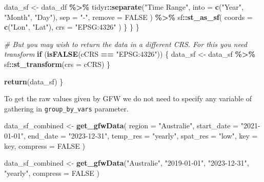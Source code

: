 \documentclass[
]{article}
\newenvironment{Shaded}{\begin{snugshade}}{\end{snugshade}}
\newcommand{\AttributeTok}[1]{\textcolor[rgb]{0.13,0.29,0.53}{#1}}
\newcommand{\CommentTok}[1]{\textcolor[rgb]{0.56,0.35,0.01}{\textit{#1}}}
\newcommand{\ConstantTok}[1]{\textcolor[rgb]{0.56,0.35,0.01}{#1}}
\newcommand{\ControlFlowTok}[1]{\textcolor[rgb]{0.13,0.29,0.53}{\textbf{#1}}}
\newcommand{\FunctionTok}[1]{\textcolor[rgb]{0.13,0.29,0.53}{\textbf{#1}}}
\newcommand{\NormalTok}[1]{#1}
\newcommand{\OtherTok}[1]{\textcolor[rgb]{0.56,0.35,0.01}{#1}}
\newcommand{\SpecialCharTok}[1]{\textcolor[rgb]{0.81,0.36,0.00}{\textbf{#1}}}
\newcommand{\StringTok}[1]{\textcolor[rgb]{0.31,0.60,0.02}{#1}}
\begin{document}
\begin{Shaded}
\begin{Highlighting}[]
\NormalTok{        data\_sf }\OtherTok{\textless{}{-}}\NormalTok{ data\_df }\SpecialCharTok{\%\textgreater{}\%}
\NormalTok{          tidyr}\SpecialCharTok{::}\FunctionTok{separate}\NormalTok{(}\StringTok{"Time Range"}\NormalTok{,}
            \AttributeTok{into =} \FunctionTok{c}\NormalTok{(}\StringTok{"Year"}\NormalTok{, }\StringTok{"Month"}\NormalTok{, }\StringTok{"Day"}\NormalTok{),}
            \AttributeTok{sep =} \StringTok{"{-}"}\NormalTok{,}
            \AttributeTok{remove =} \ConstantTok{FALSE}
\NormalTok{          ) }\SpecialCharTok{\%\textgreater{}\%}
\NormalTok{          sf}\SpecialCharTok{::}\FunctionTok{st\_as\_sf}\NormalTok{(}
            \AttributeTok{coords =} \FunctionTok{c}\NormalTok{(}\StringTok{"Lon"}\NormalTok{, }\StringTok{"Lat"}\NormalTok{),}
            \AttributeTok{crs =} \StringTok{"EPSG:4326"}
\NormalTok{          )}
\NormalTok{      \}}
\NormalTok{    \}}
\NormalTok{  \}}

  \CommentTok{\# But you may wish to return the data in a different CRS. For this you need transform}
  \ControlFlowTok{if}\NormalTok{ (}\FunctionTok{isFALSE}\NormalTok{(cCRS }\SpecialCharTok{==} \StringTok{"EPSG:4326"}\NormalTok{)) \{}
\NormalTok{    data\_sf }\OtherTok{\textless{}{-}}\NormalTok{ data\_sf }\SpecialCharTok{\%\textgreater{}\%}
\NormalTok{      sf}\SpecialCharTok{::}\FunctionTok{st\_transform}\NormalTok{(}\AttributeTok{crs =}\NormalTok{ cCRS)}
\NormalTok{  \}}

  \FunctionTok{return}\NormalTok{(data\_sf)}
\NormalTok{\}}
\end{Highlighting}
\end{Shaded}

To get the raw values given by GFW we do not need to specify any
variable of gathering in \texttt{group\_by\_vars} parameter.

\begin{Shaded}
\begin{Highlighting}[]
\NormalTok{data\_sf\_combined }\OtherTok{\textless{}{-}} \FunctionTok{get\_gfwData}\NormalTok{(}
  \AttributeTok{region =} \StringTok{"Australie"}\NormalTok{,}
  \AttributeTok{start\_date =} \StringTok{"2021{-}01{-}01"}\NormalTok{,}
  \AttributeTok{end\_date =} \StringTok{"2023{-}12{-}31"}\NormalTok{,}
  \AttributeTok{temp\_res =} \StringTok{"yearly"}\NormalTok{,}
  \AttributeTok{spat\_res =} \StringTok{"low"}\NormalTok{,}
  \AttributeTok{key =}\NormalTok{ key,}
  \AttributeTok{compress =} \ConstantTok{FALSE}
\NormalTok{)}

\NormalTok{data\_sf\_combined }\OtherTok{\textless{}{-}} \FunctionTok{get\_gfwData}\NormalTok{(}\StringTok{"Australie"}\NormalTok{,}
  \StringTok{"2019{-}01{-}01"}\NormalTok{,}
  \StringTok{"2023{-}12{-}31"}\NormalTok{,}
  \StringTok{"yearly"}\NormalTok{,}
  \AttributeTok{compress =} \ConstantTok{FALSE}
\NormalTok{)}
\end{Highlighting}
\end{Shaded}
\end{document}
